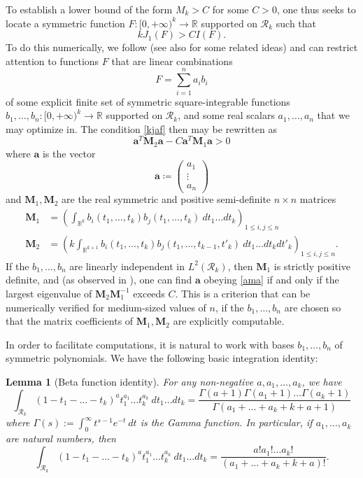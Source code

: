 \documentclass{bmcart}
\theoremstyle{plain}
\newtheorem{lemma}[theorem]{Lemma}
\theoremstyle{definition}
\newcommand\R{\mathbb{R}}
\begin{document}
To establish a lower bound of the form $M_k > C$ for some $C > 0$, one thus seeks to locate a symmetric function $F: [0,+\infty)^k \to \R$ supported on ${\mathcal R}_k$ such that
\begin{equation}\label{kjaf}
 k J_1(F) > C I(F).
\end{equation}
To do this numerically, we follow \cite{maynard-new} (see also \cite{gpy} for some related ideas) and can restrict attention to functions $F$ that are linear combinations
$$ F = \sum_{i=1}^n a_i b_i$$
of some explicit finite set of symmetric square-integrable functions $b_1,\dots,b_n: [0,+\infty)^k \to \R$ supported on ${\mathcal R}_k$, and some real scalars $a_1,\dots,a_n$ that we may optimize in.  The condition \eqref{kjaf} then may be rewritten as
\begin{equation}\label{ama}
 \mathbf{a}^T \mathbf{M}_2 \mathbf{a} - C \mathbf{a}^T \mathbf{M}_1 \mathbf{a} > 0
\end{equation}
where $\mathbf{a}$ is the vector
$$ \mathbf{a} \coloneqq \begin{pmatrix} a_1 \\ \vdots \\ a_n \end{pmatrix}
$$
and $\mathbf{M}_1,\mathbf{M}_2$ are the real symmetric and positive semi-definite $n \times n$ matrices
\begin{align}\label{Eq:M1}
\mathbf{M}_1 &= \left( \int_{\R^k} b_i(t_1,\dots,t_k) b_j(t_1,\dots,t_k)\ dt_1 \dots dt_k \right)_{1 \leq i,j \leq n} \\\label{Eq:M2}
\mathbf{M}_2 &= \left( k \int_{\R^{k+1}} b_i(t_1,\dots,t_k) b_j(t_1,\dots,t_{k-1},t'_k)\ dt_1 \dots dt_k dt'_k\right)_{1 \leq i,j \leq n}.
\end{align}
If the $b_1,\dots,b_n$ are linearly independent in $L^2({\mathcal R}_k)$, then $\mathbf{M}_1$ is strictly positive definite, and (as observed in \cite[Lemma 8.3]{maynard-new}), one can find $\mathbf{a}$ obeying \eqref{ama} if and only if the largest eigenvalue of $\mathbf{M}_2 \mathbf{M}_1^{-1}$ exceeds $C$.  This is a criterion that can be numerically verified for medium-sized values of $n$, if the $b_1,\dots,b_n$ are chosen so that the matrix coefficients of $\mathbf{M}_1,\mathbf{M}_2$ are explicitly computable.

In order to facilitate computations, it is natural to work with bases $b_1,\dots,b_n$ of symmetric polynomials.  We have the following basic integration identity:

\begin{lemma}[Beta function identity]\label{bfi}  For any non-negative $a,a_1,\dots,a_k$, we have
$$ \int_{{\mathcal R}_k} (1-t_1-\dots-t_k)^a t_1^{a_1} \dots t_k^{a_k}\ dt_1 \dots dt_k = \frac{\Gamma(a+1) \Gamma(a_1+1) \dots \Gamma(a_k+1)}{\Gamma(a_1+\dots+a_k+k+a+1)}$$
where $\Gamma(s) := \int_0^\infty t^{s-1} e^{-t}\ dt$ is the Gamma function.  In particular, if $a_1,\dots,a_k$ are natural numbers, then
$$ \int_{{\mathcal R}_k} (1-t_1-\dots-t_k)^a t_1^{a_1} \dots t_k^{a_k}\ dt_1 \dots dt_k = \frac{a! a_1! \dots a_k!}{(a_1+\dots+a_k+k+a)!}.$$
\end{lemma}
\end{document}
